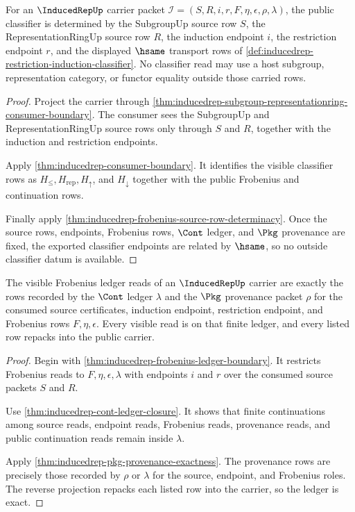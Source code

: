 \begin{theorem}
\label{thm:inducedrep-source-classifier-obligation}
For an $\InducedRepUp$ carrier packet
$\mathcal{I}=(S,R,i,r,F,\eta,\epsilon,\rho,\lambda)$, the public classifier
is determined by the SubgroupUp source row $S$, the RepresentationRingUp
source row $R$, the induction endpoint $i$, the restriction endpoint $r$,
and the displayed $\hsame$ transport rows of
\autoref{def:inducedrep-restriction-induction-classifier}. No classifier
read may use a host subgroup, representation category, or functor equality
outside those carried rows.
\end{theorem}
\begin{proof}
Project the carrier through
\autoref{thm:inducedrep-subgroup-representationring-consumer-boundary}. The
consumer sees the SubgroupUp and RepresentationRingUp source rows only
through $S$ and $R$, together with the induction and restriction endpoints.

Apply \autoref{thm:inducedrep-consumer-boundary}. It identifies the visible
classifier rows as $H_{\leq},H_{\mathrm{rep}},H_{\uparrow}$, and
$H_{\downarrow}$ together with the public Frobenius and continuation rows.

Finally apply \autoref{thm:inducedrep-frobenius-source-row-determinacy}. Once
the source rows, endpoints, Frobenius rows, $\Cont$ ledger, and $\Pkg$
provenance are fixed, the exported classifier endpoints are related by
$\hsame$, so no outside classifier datum is available.
\end{proof}

\begin{theorem}
\label{thm:inducedrep-ledger-exactness-obligation}
The visible Frobenius ledger reads of an $\InducedRepUp$ carrier are exactly
the rows recorded by the $\Cont$ ledger $\lambda$ and the $\Pkg$ provenance
packet $\rho$ for the consumed source certificates, induction endpoint,
restriction endpoint, and Frobenius rows $F,\eta,\epsilon$. Every visible
read is on that finite ledger, and every listed row repacks into the public
carrier.
\end{theorem}
\begin{proof}
Begin with \autoref{thm:inducedrep-frobenius-ledger-boundary}. It restricts
Frobenius reads to $F,\eta,\epsilon,\lambda$ with endpoints $i$ and $r$ over
the consumed source packets $S$ and $R$.

Use \autoref{thm:inducedrep-cont-ledger-closure}. It shows that finite
continuations among source reads, endpoint reads, Frobenius reads, provenance
reads, and public continuation reads remain inside $\lambda$.

Apply \autoref{thm:inducedrep-pkg-provenance-exactness}. The provenance rows
are precisely those recorded by $\rho$ or $\lambda$ for the source,
endpoint, and Frobenius roles. The reverse projection repacks each listed
row into the carrier, so the ledger is exact.
\end{proof}

